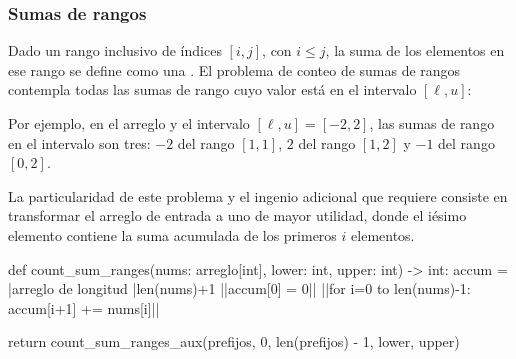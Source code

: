 \subsubsection{Sumas de rangos}
\label{sec:rangos_sumas}

Dado un rango inclusivo de índices \([i, j]\), con \(i\leq j\), la suma de los elementos en ese rango se define como una . El problema de conteo de sumas de rangos contempla todas las sumas de rango cuyo valor está en el intervalo \([\ell, u]\):
\begin{especificacion}
\end{especificacion}
Por ejemplo, en el arreglo \inline{[-3, -2, 4]} y el intervalo \([\ell, u] = [-2, 2]\), las sumas de rango en el intervalo son tres: \(-2\) del rango \([1, 1]\), \(2\) del rango \([1, 2]\) y \(-1\) del rango \([0, 2]\).


La particularidad de este problema y el ingenio adicional que requiere consiste en transformar el arreglo de entrada a uno de mayor utilidad, donde el iésimo elemento contiene la suma acumulada de los primeros $i$ elementos. 
\begin{codeblock}
\begin{pseudocode}
def count_sum_ranges(nums: arreglo[int], lower: int, upper: int) -> int:
    accum = |\textrm{arreglo de longitud }|len(nums)+1
    ||accum[0] = 0||
    ||for i=0 to len(nums)-1:
        accum[i+1] += nums[i]||

    return count_sum_ranges_aux(prefijos, 0, len(prefijos) - 1, lower, upper)
\end{pseudocode}
\begin{annotations}
\end{annotations}
\end{codeblock}

